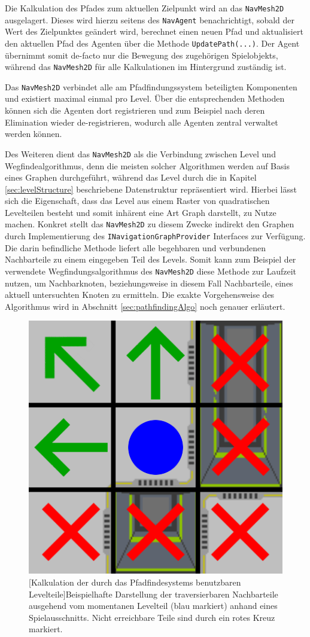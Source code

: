 Die Kalkulation des Pfades zum aktuellen Zielpunkt wird an das \texttt{NavMesh2D} ausgelagert. Dieses wird hierzu seitens des \texttt{NavAgent} benachrichtigt, sobald der Wert des Zielpunktes geändert wird, berechnet einen neuen Pfad und aktualisiert den aktuellen Pfad des Agenten über die Methode \texttt{UpdatePath(...)}. Der Agent übernimmt somit de-facto nur die Bewegung des zugehörigen Spielobjekts, während das \texttt{NavMesh2D} für alle Kalkulationen im Hintergrund zuständig ist.

Das \texttt{NavMesh2D} verbindet alle am Pfadfindungssystem beteiligten Komponenten und existiert maximal einmal pro Level. Über die entsprechenden Methoden können sich die Agenten dort registrieren und zum Beispiel nach deren Elimination wieder de-registrieren, wodurch alle Agenten zentral verwaltet werden können. 

Des Weiteren dient das \texttt{NavMesh2D} als die Verbindung zwischen Level und Wegfindealgorithmus, denn die meisten solcher Algorithmen werden auf Basis eines Graphen durchgeführt, während das Level durch die in Kapitel \ref{sec:levelStructure} beschriebene Datenstruktur repräsentiert wird. Hierbei lässt sich die Eigenschaft, dass das Level aus einem Raster von quadratischen Levelteilen besteht und somit inhärent eine Art Graph darstellt, zu Nutze machen. Konkret stellt das \texttt{NavMesh2D} zu diesem Zwecke indirekt den Graphen durch Implementierung des \texttt{INavigationGraphProvider} Interfaces zur Verfügung. Die darin befindliche Methode liefert alle begehbaren und verbundenen Nachbarteile zu einem eingegeben Teil des Levels. Somit kann zum Beispiel der verwendete Wegfindungsalgorithmus des \texttt{NavMesh2D} diese Methode zur Laufzeit nutzen, um Nachbarknoten, beziehungsweise in diesem Fall Nachbarteile, eines aktuell untersuchten Knoten zu ermitteln. Die exakte Vorgehensweise des Algorithmus wird in Abschnitt \ref{sec:pathfindingAlgo} noch genauer erläutert.

\begin{figure}[h]
 \centering
 \includegraphics[width=0.4\linewidth]{pics/Graph_Generation.PNG}
 [Kalkulation der durch das Pfadfindesystems benutzbaren Levelteile]{Beispielhafte Darstellung der traversierbaren Nachbarteile ausgehend vom momentanen Levelteil (blau markiert) anhand eines Spielausschnitts. Nicht erreichbare Teile sind durch ein rotes Kreuz markiert.}
	\label{fig:graphNeighbourTiles}
\end{figure}

